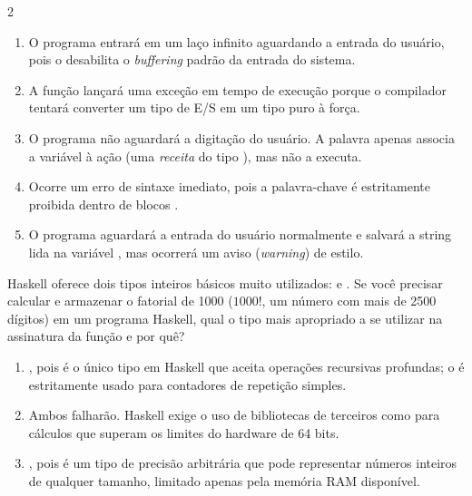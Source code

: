 \documentclass[a4paper,10pt,brazil]{article}
\begin{document}
\begin{multicols}{2}
\begin{enumerate}
  \item O programa entrará em um laço infinito aguardando a entrada do usuário, pois o  desabilita o \emph{buffering} padrão da entrada do sistema.

  \item A função  lançará uma exceção em tempo de execução porque o compilador tentará converter um tipo de E/S em um tipo puro à força.

  \item O programa não aguardará a digitação do usuário. A palavra  apenas associa a variável  à ação (uma \emph{receita} do tipo ), mas não a executa.

  \item Ocorre um erro de sintaxe imediato, pois a palavra-chave  é estritamente proibida dentro de blocos .

  \item O programa aguardará a entrada do usuário normalmente e salvará a string lida na variável , mas ocorrerá um aviso (\emph{warning}) de estilo.


\end{enumerate}

Haskell oferece dois tipos inteiros básicos muito utilizados:  e . Se você precisar calcular e armazenar o fatorial de 1000 ($1000!$, um número com mais de 2500 dígitos) em um programa Haskell, qual o tipo mais apropriado a se utilizar na assinatura da função e por quê?

\begin{enumerate}
  \item {}, pois é o único tipo em Haskell que aceita operações recursivas profundas; o  é estritamente usado para contadores de repetição simples.

  \item Ambos falharão. Haskell exige o uso de bibliotecas de terceiros como  para cálculos que superam os limites do hardware de 64 bits.

  \item {}, pois é um tipo de precisão arbitrária que pode representar números inteiros de qualquer tamanho, limitado apenas pela memória RAM disponível.


\end{enumerate}
\end{multicols}
\end{document}
